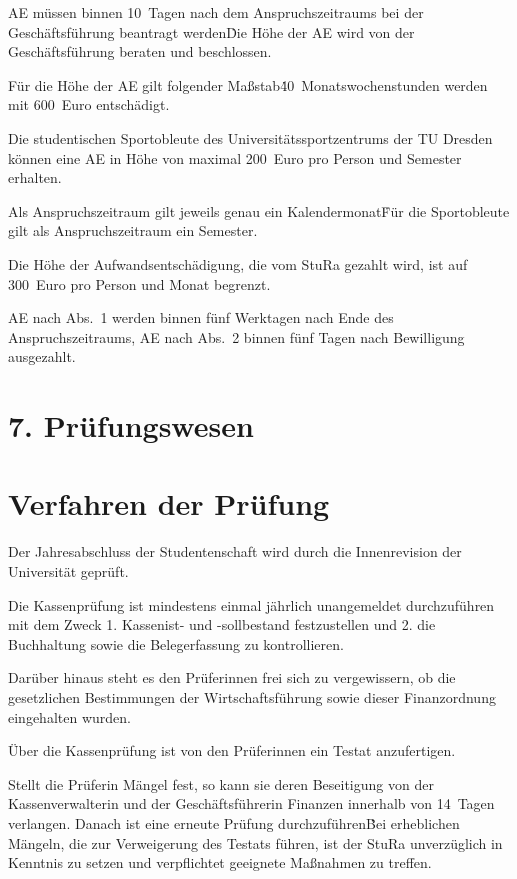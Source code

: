\begin{multicols}{2}
\Abs \Satz AE müssen binnen 10~Tagen nach dem Anspruchszeitraums bei der Geschäftsführung beantragt werden\. Die Höhe der AE wird von der Geschäftsführung beraten und beschlossen.

\Abs \Satz Für die Höhe der AE gilt folgender Maßstab\. 40~Monatswochenstunden werden mit 600~Euro entschädigt.

\Abs \Satz Die studentischen Sportobleute des Universitätssportzentrums der TU Dresden können eine AE in Höhe von maximal 200~Euro pro Person und Semester erhalten.

\Abs \Satz Als Anspruchszeitraum gilt jeweils genau ein Kalendermonat\. Für die Sportobleute gilt als Anspruchszeitraum ein Semester.

\Abs \Satz Die Höhe der Aufwandsentschädigung, die vom StuRa gezahlt wird, ist auf 300~Euro pro Person und Monat begrenzt.

\Abs \Satz AE nach Abs.~1 werden binnen fünf Werktagen nach Ende des Anspruchszeitraums, AE nach Abs.~2 binnen fünf Tagen nach Bewilligung ausgezahlt.


\section*{7. Prüfungswesen}



\section{Verfahren der Prüfung}

\Abs \Satz Der Jahresabschluss der Studentenschaft wird durch die Innenrevision der Universität geprüft.

\Abs \Satz Die Kassenprüfung ist mindestens einmal jährlich unangemeldet durchzuführen mit dem Zweck
1. Kassenist- und -sollbestand festzustellen und
2. die Buchhaltung sowie die Belegerfassung zu kontrollieren.

\Abs \Satz Darüber hinaus steht es den Prüferinnen frei sich zu vergewissern, ob die gesetzlichen Bestimmungen der Wirtschaftsführung sowie dieser Finanzordnung eingehalten wurden.

\Abs \Satz Über die Kassenprüfung ist von den Prüferinnen ein Testat anzufertigen.

\Abs \Satz Stellt die Prüferin Mängel fest, so kann sie deren Beseitigung von der Kassenverwalterin und der Geschäftsführerin Finanzen innerhalb von 14~Tagen verlangen. Danach ist eine erneute Prüfung durchzuführen\. Bei erheblichen Mängeln, die zur Verweigerung des Testats führen, ist der StuRa unverzüglich in Kenntnis zu setzen und verpflichtet geeignete Maßnahmen zu treffen.


\end{multicols}
